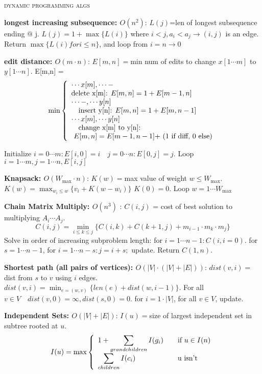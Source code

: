 \documentclass[10pt,twocolumn]{article}
\begin{document}
\begin{center}\textsc{dynamic programming algs}\end{center} 
{\bf longest increasing subsequence: $O(n^2)$}:
$L(j)$=len of longest subsequence ending @ j. $L(j)=1+\max\{L(i)\}$ where $i<j,a_i < a_j \rightarrow (i,j)$ is an edge. Return $\max\{L(i) for i\leq n\}$, and loop from $i=n\rightarrow 0$

{\bf edit distance: $O(m\cdot n)$}: $E[m,n]=$min num of edits to change $x[1\cdots m]$ to $y[1\cdots n]$. E[m,n] = \[\min\left\{ \begin{array}{l l} \cdots x[m] , \cdots - \\ \mbox{delete x[m]: $E[m,n]=1+E[m-1,n]$} \\ \cdots -, \cdots y[n] \\ \quad \mbox{insert y[n]: $E[m,n]=1+E[m,n-1]$} \\ \cdots x[m], \cdots y[n] \\ \quad \mbox{change x[m] to y[n]:}\\ \mbox{ $E[m,n]=E[m-1,n-1] +$ (1 if diff, 0 else)}  \end{array} \right. \]

Initialize $i=0\cdots m: E[i,0] = i \quad j=0\cdots n: E[0,j]=j$. Loop $i=1\cdots m, j=1\cdots n, E[i,j]$

{\bf Knapsack: $O(W_{\max}\cdot n)$}: $K(w)=$max value of weight $w\leq W_{\max}$. $K(w)=\displaystyle\max_{w_i\leq w}\{v_i+K(w-w_i)\}$ $K(0)=0$. Loop $w=1\cdots W_{\max}$

{\bf Chain Matrix Multiply: $O(n^3)$} : $C(i,j)$ = cost of best solution to multiplying $A_i\cdots A_j$. \[C(i,j)=\displaystyle\min_{i\leq k\leq j}\{ C(i,k)+C(k+1,j) + m_{i-1}\cdot m_k \cdot m_j\}\] Solve in order of increasing subproblem length: for $i=1\cdots n-1: C(i,i=0)$. for $s=1\cdots n-1$, for $i=1\cdots n-s: j=i+s; $ update. Return $C(1,n)$.

{\bf Shortest path (all pairs of vertices): $O(|V|\cdot(|V|+|E|))$}: $dist(v,i)=$ dist from $s$ to $v$ using $i$ edges. $dist(v,i)=\displaystyle\min_{e=(w,v)}\{len(e)+dist(w,i-1)\}$. For all $v\in V \quad dist(v,0)=\infty, dist(s,0)=0$. for $i=1\cdot |V|$, for all $v\in V$, update.

{\bf Independent Sets: $O(|V|+|E|)$}: $I(u)=$size of largest independent set in subtree rooted at $u$. \[I(u) = \max\left\{ \begin{array}{l l} 1+\displaystyle\sum_{grandchildren} I(g_i) & \quad \mbox{if $u\in I(n)$} \\ \displaystyle\sum_{children} I(c_i) & \quad \mbox{u isn't} \\ \end{array} \right. \]
\end{document}
